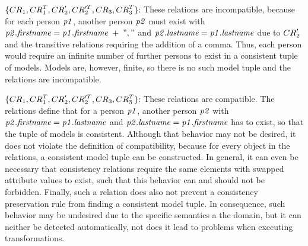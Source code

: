 \begin{example}
\begin{properdescription}
\item[$\setted{\consistencyrelation{CR}{1}, \consistencyrelation{CR}{1}^T,\consistencyrelation{CR}{2}', \consistencyrelation{CR}{2}'^T, \consistencyrelation{CR}{3}, \consistencyrelation{CR}{3}^T}$:]
These relations are incompatible, because for each person $\mathit{p1}$, another person $\mathit{p2}$ must exist with $\mathit{p2.firstname} = \mathit{p1.firstname}\; +\; ","$ and $\mathit{p2.lastname} = \mathit{p1.lastname}$ due to $\consistencyrelation{CR}{2}'$ and the transitive relations requiring the addition of a comma. Thus, each person would require an infinite number of further persons to exist in a consistent tuple of models. Models are, however, finite, so there is no such model tuple and the relations are incompatible.

\item[$\setted{\consistencyrelation{CR}{1}, \consistencyrelation{CR}{1}^T, \consistencyrelation{CR}{2}', \consistencyrelation{CR}{2}'^T, \consistencyrelation{CR}{3}, \consistencyrelation{CR}{3}^T}$:]
These relations are compatible. The relations define that for a person $\mathit{p1}$, another person $\mathit{p2}$ with $\mathit{p2.firstname} = \mathit{p1.lastname}$ and $\mathit{p2.lastname} = \mathit{p1.firstname}$ has to exist, so that the tuple of models is consistent.
Although that behavior may not be desired, it does not violate the definition of compatibility, because for every object in the relations, a consistent model tuple can be constructed.
In general, it can even be necessary that consistency relations require the same elements with swapped attribute values to exist, such that this behavior can and should not be forbidden.
Finally, such a relation does also not prevent a consistency preservation rule from finding a consistent model tuple.
In consequence, such behavior may be undesired due to the specific semantics a the domain, but it can neither be detected automatically, not does it lead to problems when executing transformations.


\end{properdescription}
\end{example}
